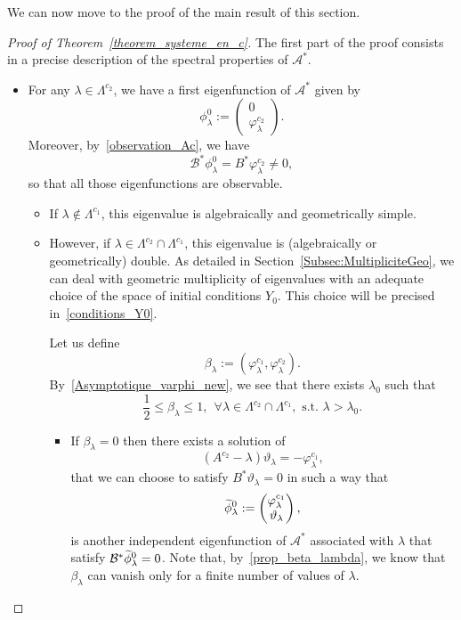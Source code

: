 \documentclass[11pt]{article}
\theoremstyle{definition}
\numberwithin{equation}{section}
\numberwithin{figure}{section}
\numberwithin{table}{section}
\newcommand{\fprop}[2]{\varphi^{#1}_{#2}}
\newcommand\As{\mathcal{A}^*}
\newcommand\Bs{\mathcal{B}^*}
\newcommand{\Fzp}{Y_0}
\let\oldtilde\tilde
\renewcommand*{\tilde}[1]{\mathchoice{\widetilde{#1}}{\widetilde{#1}}{\oldtilde{#1}}{\oldtilde{#1}}}\let\oldexists\exists
\renewcommand*{\exists}{\mathrel{\oldexists}}
\let\oldforall\forall
\renewcommand*{\forall}{\mathrel{\oldforall}}
\begin{document}
We can now move to the proof of the main result of this section.
\begin{proof}[Proof of Theorem~\ref{theorem_systeme_en_c}]
The first part of the proof consists in a precise description of the spectral properties of $\As$.
\begin{itemize}
\item For any $\lambda\in \Lambda^{c_2}$, we have a first eigenfunction of $\As$ given by
\begin{equation}\label{systeme_en_c_fp1}
\phi_{\lambda}^0 :=
\begin{pmatrix} 
0 \\ \fprop{c_2}{\lambda}
\end{pmatrix}.
\end{equation}
Moreover, by~\eqref{observation_Ac}, we have
\[
\Bs \phi_{\lambda}^0= B^*\fprop{c_2}{\lambda} \neq 0,
\]
so that all those eigenfunctions are observable.
\begin{itemize}
\item If $\lambda\not\in \Lambda^{c_1}$, this eigenvalue is algebraically and geometrically simple.
\item However, if $\lambda\in \Lambda^{c_2}\cap \Lambda^{c_1}$, this eigenvalue is (algebraically or geometrically) double. As detailed in Section~\ref{Subsec:MultipliciteGeo}, we can deal with geometric multiplicity of eigenvalues with an adequate choice of the space of initial conditions $\Fzp$. This choice will be precised in~\eqref{conditions_Y0}.

Let us define
\begin{equation}\label{def_beta_lambda}
\beta_\lambda:=(\fprop{c_1}{\lambda},\fprop{c_2}{\lambda}).
\end{equation}
By~\eqref{Asymptotique_varphi_new}, we see that there exists $\lambda_0$ such that
\begin{equation}\label{prop_beta_lambda}
\frac{1}{2} \leq \beta_\lambda\leq 1, \ \ \forall \lambda\in \Lambda^{c_2}\cap \Lambda^{c_1}, \text{ s.t. } \lambda>\lambda_0.
\end{equation}
\begin{itemize}
\item If $\beta_\lambda=0$ then there exists a solution of
\[
(A^{c_2}-\lambda) \vartheta_\lambda = - \fprop{c_1}{\lambda},
\]
that we can choose to satisfy $B^* \vartheta_\lambda=0$ in such a way that
\[
\tilde{\phi}_\lambda^0:=
\begin{pmatrix} \fprop{c_1}{\lambda} \\ \vartheta_\lambda
\end{pmatrix},
\]
is another independent eigenfunction of $\As$ associated with $\lambda$ that satisfy $\Bs \tilde{\phi}^0_\lambda=0$. Note that, by~\eqref{prop_beta_lambda}, we know that $\beta_\lambda$ can vanish only for a finite number of values of $\lambda$.


\end{itemize}
\end{itemize}
\end{itemize}
\end{proof}
\end{document}
